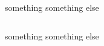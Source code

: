 \documentclass{beamer}
\begin{document}
    
\begin{frame}
    \begin{columns}[onlytextwidth]
      something
      something else  
  \end{columns}
\end{frame} 

\begin{frame}
    \columns[onlytextwidth]
      something
      something else  
  \endcolumns
\end{frame} 
    
\end{document}
